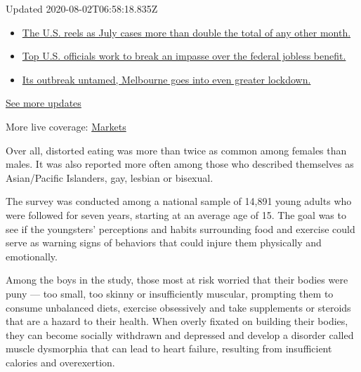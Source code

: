 Updated 2020-08-02T06:58:18.835Z

\begin{itemize}
\tightlist
\item
  \href{https://www.nytimes.com/2020/08/01/world/coronavirus-covid-19.html?action=click\&pgtype=Article\&state=default\&region=MAIN_CONTENT_1\&context=storylines_live_updates\#link-34047410}{The
  U.S. reels as July cases more than double the total of any other
  month.}
\item
  \href{https://www.nytimes.com/2020/08/01/world/coronavirus-covid-19.html?action=click\&pgtype=Article\&state=default\&region=MAIN_CONTENT_1\&context=storylines_live_updates\#link-780ec966}{Top
  U.S. officials work to break an impasse over the federal jobless
  benefit.}
\item
  \href{https://www.nytimes.com/2020/08/01/world/coronavirus-covid-19.html?action=click\&pgtype=Article\&state=default\&region=MAIN_CONTENT_1\&context=storylines_live_updates\#link-2bc8948}{Its
  outbreak untamed, Melbourne goes into even greater lockdown.}
\end{itemize}

\href{https://www.nytimes.com/2020/08/01/world/coronavirus-covid-19.html?action=click\&pgtype=Article\&state=default\&region=MAIN_CONTENT_1\&context=storylines_live_updates}{See
more updates}

More live coverage:
\href{https://www.nytimes.com/live/2020/07/31/business/stock-market-today-coronavirus?action=click\&pgtype=Article\&state=default\&region=MAIN_CONTENT_1\&context=storylines_live_updates}{Markets}

Over all, distorted eating was more than twice as common among females
than males. It was also reported more often among those who described
themselves as Asian/Pacific Islanders, gay, lesbian or bisexual.

The survey was conducted among a national sample of 14,891 young adults
who were followed for seven years, starting at an average age of 15. The
goal was to see if the youngsters' perceptions and habits surrounding
food and exercise could serve as warning signs of behaviors that could
injure them physically and emotionally.

Among the boys in the study, those most at risk worried that their
bodies were puny --- too small, too skinny or insufficiently muscular,
prompting them to consume unbalanced diets, exercise obsessively and
take supplements or steroids that are a hazard to their health. When
overly fixated on building their bodies, they can become socially
withdrawn and depressed and develop a disorder called muscle dysmorphia
that can lead to heart failure, resulting from insufficient calories and
overexertion.


